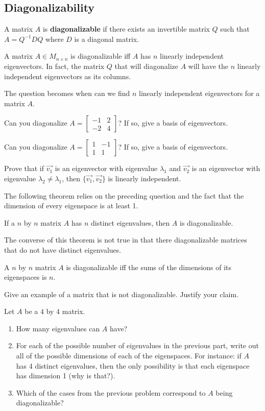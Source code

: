 \subsection{Diagonalizability}
\begin{definition}
A matrix $A$ is \textbf{diagonalizable} if there exists an invertible matrix $Q$ such that $A=Q^{-1}DQ$ where $D$ is a diagonal matrix.
\end{definition}
\begin{theorem}
A matrix $A \in M_{n \times n}$ is diagonalizable iff $A$ has $n$ linearly independent eigenvectors. In fact, the matrix $Q$ that will diagonalize $A$ will have the $n$ linearly independent eigenvectors as its columns.
\end{theorem}
The question becomes when can we find $n$ linearly independent eigenvectors for a matrix $A$.

\bq Can you diagonalize $A=\begin{bmatrix} -1&2\\-2&4 \end{bmatrix}$? If so, give a basis of eigenvectors. \eq

\bq Can you diagonalize $A=\begin{bmatrix} 1&-1\\1&1 \end{bmatrix}$? If so, give a basis of eigenvectors. \eq

\bq Prove that if $\vec{v_1}$ is an eigenvector with eigenvalue $\lambda_1$ and $\vec{v_2}$ is an eigenvector with eigenvalue $\lambda_2 \neq \lambda_1$, then $\{ \vec{v_1},\vec{v_2} \}$ is linearly independent.  \eq

The following theorem relies on the preceding question and the fact that the dimension of every eigenspace is at least 1.
\begin{theorem}
If a $n$ by $n$ matrix $A$ has $n$ distinct eigenvalues, then $A$ is diagonalizable.
\end{theorem}
The converse of this theorem is not true in that there diagonalizable matrices that do not have distinct eigenvalues.

\begin{theorem}
A $n$ by $n$ matrix $A$ is diagonalizable iff the sums of the dimensions of its eigenspaces is $n$.
\end{theorem}

\bq Give an example of a matrix that is not diagonalizable. Justify your claim.
\eq

\bq Let $A$ be a $4$ by $4$ matrix. \begin{enumerate} \item How many eigenvalues can $A$ have?
\item For each of the possible number of eigenvalues in the previous part, write out all of the possible dimensions of each of the eigenspaces. For instance: if $A$ has 4 distinct eigenvalues, then the only possibility is that each eigenspace has dimension 1 (why is that?).
\item Which of the cases from the previous problem correspond to $A$ being diagonalizable?
\end{enumerate}
\eq
